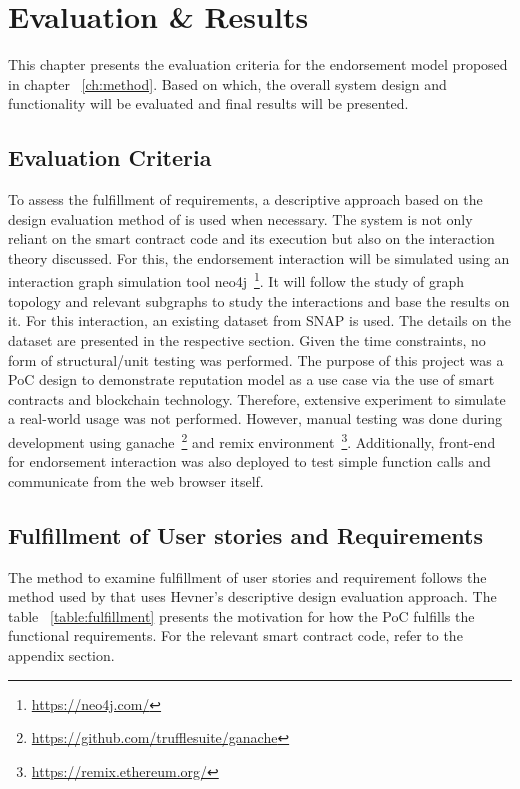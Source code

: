 \chapter{Evaluation \& Results} \label{ch:results}
This chapter presents the evaluation criteria for the endorsement model
proposed in chapter ~\ref{ch:method}. Based on which, the overall system design
and functionality will be evaluated and final results will be presented. 

\section{Evaluation Criteria}
To assess the fulfillment of requirements, a descriptive approach
based on the design evaluation method of \cite{hevner2010design} is used when
necessary. The system is not only reliant on the smart contract code and its
execution but also on the interaction theory discussed. For this, the
endorsement interaction will be simulated using an interaction graph simulation
tool neo4j~\footnote{\url{https://neo4j.com/}}. It will follow the study of graph topology and relevant subgraphs
to study the interactions and base the results on it. For this interaction, an
existing dataset from SNAP\cite{snapnets} is used. The details on the dataset
are presented in the respective section.  Given the time constraints, no form
of structural/unit testing was performed. The purpose of this project was a PoC
design to demonstrate reputation model as a use case via the use of smart
contracts and blockchain technology. Therefore, extensive experiment to
simulate a real-world usage was not performed. However, manual testing was done
during development using
ganache~\footnote{\url{https://github.com/trufflesuite/ganache}} and remix
environment~\footnote{\url{https://remix.ethereum.org/}}. Additionally, front-end for
endorsement interaction was also deployed to test simple function calls and
communicate from the web browser itself. 

\section{Fulfillment of User stories and Requirements}\label{fulfillment}
The method to examine fulfillment of user stories and requirement follows the
method used by \cite{Bergquist1107612} that uses Hevner's descriptive design
evaluation approach\cite{hevner2010design}. The table ~\ref{table:fulfillment}
presents the motivation for how the PoC fulfills the functional requirements. 
For the relevant smart contract code, refer to the appendix section. \\ 

